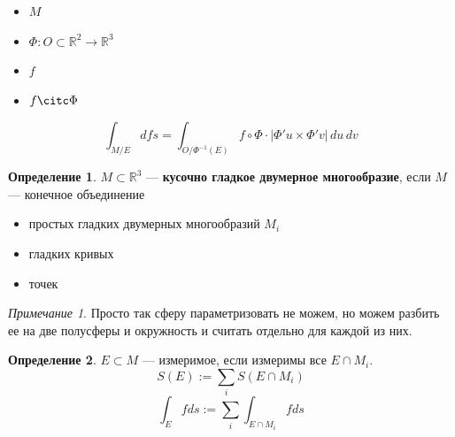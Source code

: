 \documentclass[oneside]{book}
\newcommand{\R}{\mathbb{R}}
\theoremstyle{plain}
\theoremstyle{remark}
\newtheorem*{remark}{Примечание}
\theoremstyle{definition}
\newtheorem*{definition}{Определение}
\begin{document}
\begin{itemize}
\item \(M\)
\item \(\Phi: O \subset \R^2 \to \R^3\)
\item \(f\)
\item \(f \citc \Phi\)
\end{itemize}
\[ \int_{M/E} d fs = \int_{O/\Phi^{-1}(E)} f \circ \Phi \cdot |\Phi'u\times\Phi'v|\,du\,dv \]
\begin{definition}
\(M \subset \R^3\) --- \textbf{кусочно гладкое двумерное многообразие}, если
\(M\) --- конечное объединение
\begin{itemize}
\item простых гладких двумерных многообразий \(M_i\)
\item гладких кривых
\item точек
\end{itemize}
\end{definition}
\begin{remark}
Просто так сферу параметризовать не можем, но можем разбить ее на две полусферы и окружность и считать отдельно для каждой из них.
\end{remark}
\begin{definition}
\(E \subset M\) --- измеримое, если измеримы все \(E \cap M_i\). \\
\[S(E) := \sum_i S(E\cap M_i) \]
\[ \int_E f ds := \sum_i \int_{E \cap M_i} f ds \]
\end{definition}
\end{document}

